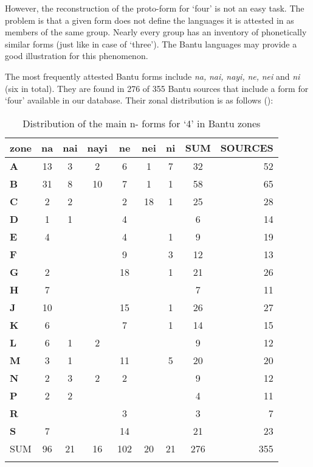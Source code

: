 However, the reconstruction of the proto-form for ‘four’ is not an easy task. The problem is that a given form does not define the languages it is attested in as members of the same group. Nearly every group has an inventory of phonetically similar forms (just like in case of ‘three’). The Bantu languages may provide a good illustration for this phenomenon. 

The most frequently attested Bantu forms include \textit{na,} \textit{nai,} \textit{nayi,} \textit{ne,} \textit{nei} and \textit{ni} (six in total). They are found in 276 of 355 Bantu sources that include a form for ‘four’ available in our database. Their zonal distribution is as follows ():   

\begin{table}
\caption{\label{tab:4:14}Distribution of the main n- forms for `4' in Bantu zones}


\begin{tabularx}{\textwidth}{lSSSSSSSr}
\lsptoprule
zone & \textbf{na} & \textbf{nai} & \textbf{nayi} & \textbf{ne} & \textbf{nei} & \textbf{ni} & SUM&SOURCES\\
\midrule
\textbf{A} & 13 & 3 & 2 & 6 & 1 & 7 & 32 & 52\\
\textbf{B} & 31 & 8 & 10 & 7 & 1 & 1 & 58 & 65\\
\textbf{C} & 2 & 2 & ~ & 2 & 18 & 1 & 25 & 28\\
\textbf{D} & 1 & 1 & ~ & 4 & ~ & ~ & 6 & 14\\
\textbf{E} & 4 & ~ & ~ & 4 & ~ & 1 & 9 & 19\\
\textbf{F} & ~ & ~ & ~ & 9 & ~ & 3 & 12 & 13\\
\textbf{G} & 2 & ~ & ~ & 18 & ~ & 1 & 21 & 26\\
\textbf{H} & 7 & ~ & ~ & ~ & ~ & ~ & 7 & 11\\
\textbf{J} & 10 & ~ & ~ & 15 & ~ & 1 & 26 & 27\\
\textbf{K} & 6 & ~ & ~ & 7 & ~ & 1 & 14 & 15\\
\textbf{L} & 6 & 1 & 2 & ~ & ~ & ~ & 9 & 12\\
\textbf{M} & 3 & 1 & ~ & 11 & ~ & 5 & 20 & 20\\
\textbf{N} & 2 & 3 & 2 & 2 & ~ & ~ & 9 & 12\\
\textbf{P} & 2 & 2 & ~ & ~ & ~ & ~ & 4 & 11\\
\textbf{R} & ~ & ~ & ~ & 3 & ~ & ~ & 3 & 7\\
\textbf{S} & 7 & ~ & ~ & 14 & ~ & ~ & 21 & 23\\
\midrule 
SUM & 96 & 21 & 16 & 102 & 20 & 21 & 276 & 355\\

\lspbottomrule
\end{tabularx}
\end{table}

